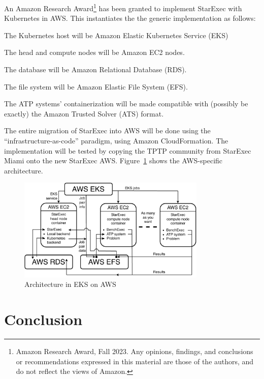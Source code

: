 \documentclass{easychair}
\newenvironment{packed_itemize}{
\vspace*{-0.3em}
\begin{itemize}
\setlength{\partopsep}{0pt}
\setlength{\itemsep}{1pt}
\setlength{\parskip}{0pt}
\setlength{\parsep}{0pt}
}{\end{itemize}}
\begin{document}
An Amazon Research Award\footnote{%
Amazon Research Award, Fall 2023. Any opinions, findings, and conclusions or recommendations 
expressed in this material are those of the authors, and do not reflect the views of Amazon.} 
has been granted to implement StarExec with Kubernetes in AWS.
This instantiates the the generic implementation as follows:
\begin{packed_itemize}
\item The Kubernetes host will be Amazon Elastic Kubernetes Service (EKS)
\item The head and compute nodes will be Amazon EC2 nodes.
\item The database will be Amazon Relational Database (RDS).
\item The file system will be Amazon Elastic File System (EFS).
\item The ATP systems' containerization will be made compatible with (possibly be exactly) the 
      Amazon Trusted Solver (ATS) format.
\end{packed_itemize}

The entire migration of StarExec into AWS will be done using the ``infrastructure-as-code'' 
paradigm, using Amazon CloudFormation. 
The implementation will be tested by copying the TPTP community from StarExec Miami onto the 
new StarExec AWS.
Figure~\ref{ArchitectureAWS} shows the AWS-specific architecture.

\begin{figure}[htb]
\begin{center}
\includegraphics[width=0.8\textwidth]{ArchitectureAWS}
\caption{Architecture in EKS on AWS}
\label{ArchitectureAWS}
\end{center}
\end{figure}

\section{Conclusion}
\label{Conclusion}
\end{document}

